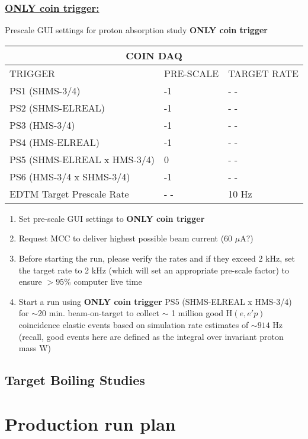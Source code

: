 \documentclass{article}
\begin{document}
\subsubsection*{\underline{ONLY coin trigger:}} 
    \begin{center}
    Prescale GUI settings for proton absorption study \textbf{ONLY coin trigger}
    \begin{tabular}{ |p{6cm}| |p{3cm}| |p{3cm}| }
    \hline
    \multicolumn{3}{|c|}{COIN DAQ} \\
    \hline
    TRIGGER & PRE-SCALE & TARGET RATE\\
    \hline
    PS1 (SHMS-3/4)    & -1  & - - \\
    PS2 (SHMS-ELREAL) &  -1  & - - \\
    PS3 (HMS-3/4)     & -1  & - -\\
    PS4 (HMS-ELREAL)  & -1  & - - \\
    PS5 (SHMS-ELREAL x HMS-3/4)  & 0 & - -  \\
    PS6 (HMS-3/4 x SHMS-3/4)     & -1 & - -  \\
    \hline
    EDTM Target Prescale Rate & - - & 10 Hz \\
    \hline
    \end{tabular}
    \end{center}
\begin{enumerate}
    \item Set pre-scale GUI settings to \textbf{ONLY coin trigger}
    \item Request MCC to deliver highest possible beam current (60 $\mu$A?)
    \item Before starting the run, please verify the rates and if they exceed 2 kHz, set the target rate to 2 kHz (which will set an appropriate pre-scale factor) to ensure $>95\%$ computer live time
    \item Start a run using \textbf{ONLY coin trigger} PS5 (SHMS-ELREAL x HMS-3/4) for $\sim$20 min. beam-on-target to collect $\sim$ 1 million good H$(e,e'p)$ coincidence elastic events based on simulation rate estimates of $\sim914$ Hz
    (recall, good events here are defined as the integral over invariant proton mass W)
\end{enumerate}      
    
\subsection{Target Boiling Studies}

\section{Production run plan} 
\end{document}
